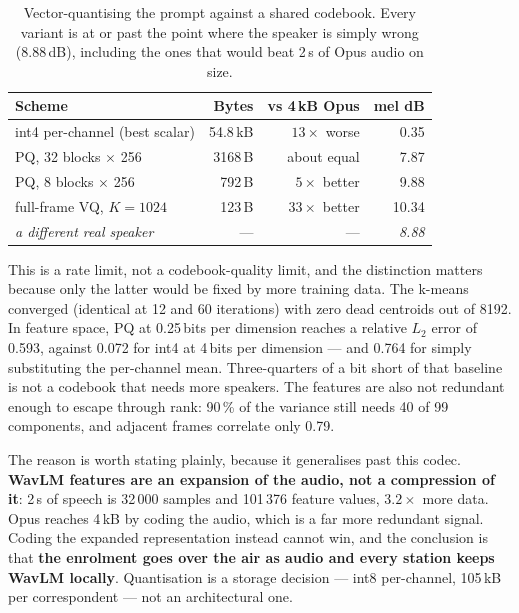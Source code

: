 \begin{table}[H]
    \centering
    \caption{Vector-quantising the prompt against a shared codebook.
             Every variant is at or past the point where the speaker is
             simply wrong (8.88\,dB), including the ones that would beat
             2\,s of Opus audio on size.}
    \label{tab:voice_vq}
    \small
    \begin{tabular}{@{}lrrr@{}}
    \toprule
    \textbf{Scheme} & \textbf{Bytes} & \textbf{vs 4\,kB Opus} &
    \textbf{mel dB} \\
    \midrule
    int4 per-channel (best scalar) & 54.8\,kB & $13\times$ worse & 0.35 \\
    PQ, 32 blocks $\times$ 256     &  3168\,B & about equal      & 7.87 \\
    PQ, 8 blocks $\times$ 256      &   792\,B & $5\times$ better & 9.88 \\
    full-frame VQ, $K=1024$        &   123\,B & $33\times$ better & 10.34 \\
    \midrule
    \emph{a different real speaker} & --- & --- & \emph{8.88} \\
    \bottomrule
    \end{tabular}
\end{table}

This is a rate limit, not a codebook-quality limit, and the distinction
matters because only the latter would be fixed by more training data.
The k-means converged (identical at 12 and 60 iterations) with zero dead
centroids out of 8192.  In feature space, PQ at 0.25\,bits per dimension
reaches a relative $L_2$ error of 0.593, against 0.072 for int4 at
4\,bits per dimension --- and 0.764 for simply substituting the
per-channel mean.  Three-quarters of a bit short of that baseline is not
a codebook that needs more speakers.  The features are also not
redundant enough to escape through rank: 90\,\% of the variance still
needs 40 of 99 components, and adjacent frames correlate only 0.79.

The reason is worth stating plainly, because it generalises past this
codec.  \textbf{WavLM features are an expansion of the audio, not a
compression of it}: 2\,s of speech is 32\,000 samples and 101\,376
feature values, $3.2\times$ more data.  Opus reaches 4\,kB by coding the
audio, which is a far more redundant signal.  Coding the expanded
representation instead cannot win, and the conclusion is that
\textbf{the enrolment goes over the air as audio and every station keeps
WavLM locally}.  Quantisation is a storage decision --- int8
per-channel, 105\,kB per correspondent --- not an architectural one.

